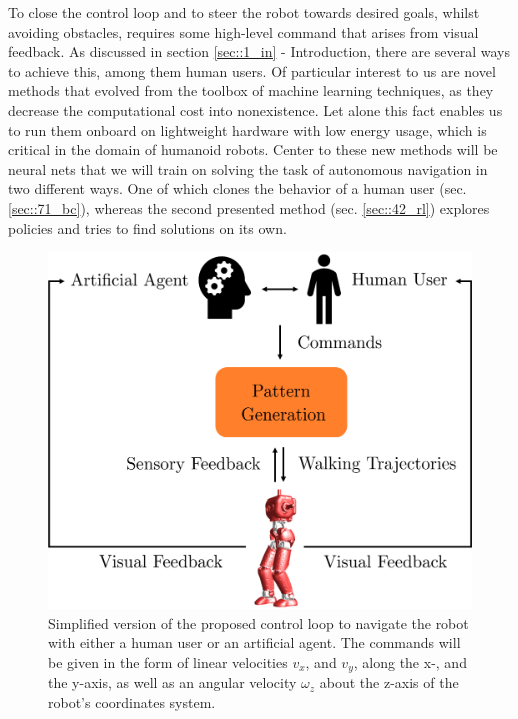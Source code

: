 \label{sec::7_ah}
To close the control loop and to steer the robot towards desired goals, whilst avoiding obstacles, requires some high-level command that arises from visual feedback. As discussed in section \ref{sec::1_in} - Introduction, there are several ways to achieve this, among them human users. Of particular interest to us are novel methods that evolved from the toolbox of machine learning techniques, as they decrease the computational cost into nonexistence. Let alone this fact enables us to run them onboard on lightweight hardware with low energy usage, which is critical in the domain of humanoid robots. Center to these new methods will be neural nets that we will train on solving the task of autonomous navigation in two different ways. One of which clones the behavior of a human user (sec. \ref{sec::71_bc}), whereas the second presented method (sec. \ref{sec::42_rl}) explores policies and tries to find solutions on its own.
\begin{figure}[h!]
	\centering
	\includegraphics[scale=.5]{chapters/07_autonomous_high_level_control_of_the_walking_pattern_generator/img/control_loop.png}
	\caption{Simplified version of the proposed control loop to navigate the robot with either a human user or an artificial agent. The commands will be given in the form of linear velocities $v_x$, and $v_y$, along the x-, and the y-axis, as well as an angular velocity $\omega_z$ about the z-axis of the robot's coordinates system.}
	\label{fig::7_cl}
\end{figure}
\FloatBarrier
